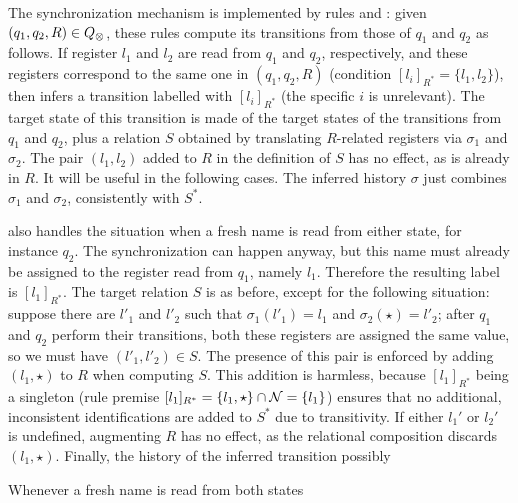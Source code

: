 The synchronization mechanism is implemented by rules \regrule{} and \allrule{}: given $(q_1,q_2,R) \in Q_{\otimes}$, these rules compute its transitions from those of $q_1$ and $q_2$ as follows.
If register $l_1$ and $l_2$ are read from $q_1$ and $q_2$, respectively, and these registers correspond to the same one in $(q_1,q_2,R)$ (condition $[l_i]_{R^*} = \{l_1,l_2\}$), then \regrule{} infers a transition labelled with $[l_i]_{R^*}$ (the specific $i$ is unrelevant). The target state of this transition is made of the target states of the transitions from $q_1$ and $q_2$, plus a relation $S$ obtained by translating $R$-related registers via $\sigma_1$ and $\sigma_2$. The pair $(l_1,l_2)$ added to $R$ in the definition of $S$ has no effect, as is already in $R$. It will be useful in the following cases. The inferred history $\sigma$ just combines $\sigma_1$ and $\sigma_2$, consistently with $S^*$.

\regrule{} also handles the situation when a fresh name is read from either state, for instance $q_2$. The synchronization can happen anyway,
but this name must already be assigned to the register read from $q_1$, namely $l_1$. Therefore the resulting label is $[l_1]_{R^*}$. The target relation $S$ is as before, except for the following situation: suppose there are $l'_1$ and $l'_2$ such that $\sigma_1(l'_1) = l_1$ and $\sigma_2(\star) = l'_2$; after $q_1$ and $q_2$ perform their transitions, both these registers are assigned the same value, so we must have $(l'_1,l'_2) \in S$. The presence of this pair is enforced by adding $(l_1,\star)$ to $R$ when computing $S$. This addition is harmless, because $[l_1]_{R^*}$ being a singleton (rule premise $[l_1]_{R^*} = \{l_1,\star\} \cap \mathcal{N} = \{l_1\}$) ensures that no additional, inconsistent identifications are added to $S^*$ due to transitivity. If either $l_1'$ or $l_2'$ is undefined, augmenting $R$ has no effect, as the relational composition discards $(l_1,\star)$. Finally, the history of the inferred transition
possibly 

Whenever a fresh name is read from both states



